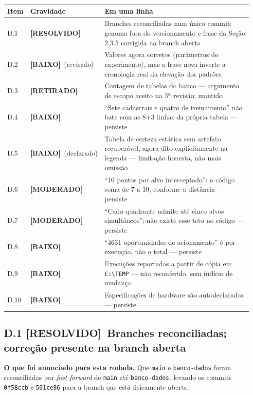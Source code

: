 \documentclass[11pt,a4paper]{article}
\newcommand{\moderado}{\textbf{\color{blue!50!black}[MODERADO]}}
\newcommand{\baixo}{\textbf{\color{gray}[BAIXO]}}
\newcommand{\retirado}{\textbf{[RETIRADO]}}
\newcommand{\resolvido}{\textbf{\color{green!40!black}[RESOLVIDO]}}
\begin{document}
\renewcommand{\arraystretch}{1.25}
\begin{longtable}{|p{0.9cm}|p{2.6cm}|p{11.6cm}|}
\hline
\textbf{Item} & \textbf{Gravidade} & \textbf{Em uma linha} \\
\hline
\endhead
D.1 & \resolvido & Branches reconciliadas num único commit; genoma fora do versionamento e frase da
Seção 2.3.5 corrigida na branch aberta \\
\hline
D.2 & \baixo\ (revisado) & Valores agora corretos (parâmetros do experimento), mas a frase nova
inverte a cronologia real da elevação dos padrões \\
\hline
D.3 & \retirado & Contagem de tabelas do banco --- argumento de escopo aceito na 3ª revisão; mantido \\
\hline
D.4 & \baixo & ``Sete cadastrais e quatro de treinamento'' não bate com as 8+3 linhas da própria
tabela --- persiste \\
\hline
D.5 & \baixo\ (declarado) & Tabela de certeza estática sem artefato recuperável, agora dito
explicitamente na legenda --- limitação honesta, não mais omissão \\
\hline
D.6 & \moderado & ``10 pontos por alvo interceptado'': o código soma de 7 a 10, conforme a distância
--- persiste \\
\hline
D.7 & \moderado & ``Cada quadrante admite até cinco alvos simultâneos'': não existe esse teto no
código --- persiste \\
\hline
D.8 & \baixo & ``4631 oportunidades de acionamento'' é por execução, não o total --- persiste \\
\hline
D.9 & \baixo & Execuções reportadas a partir de cópia em \texttt{C:\textbackslash TEMP} --- não
reconferido, sem indício de mudança \\
\hline
D.10 & \baixo & Especificações de hardware são autodeclaradas --- persiste \\
\hline
\end{longtable}

\subsection*{D.1 \resolvido\ Branches reconciliadas; correção presente na branch aberta}

\textbf{O que foi anunciado para esta rodada.} Que \texttt{main} e \texttt{banco-dados} foram
reconciliadas por \textit{fast-forward} de \texttt{main} até \texttt{banco-dados}, levando os commits
\texttt{0f58ccb} e \texttt{501ce86} para a branch que está fisicamente aberta.
\end{document}
